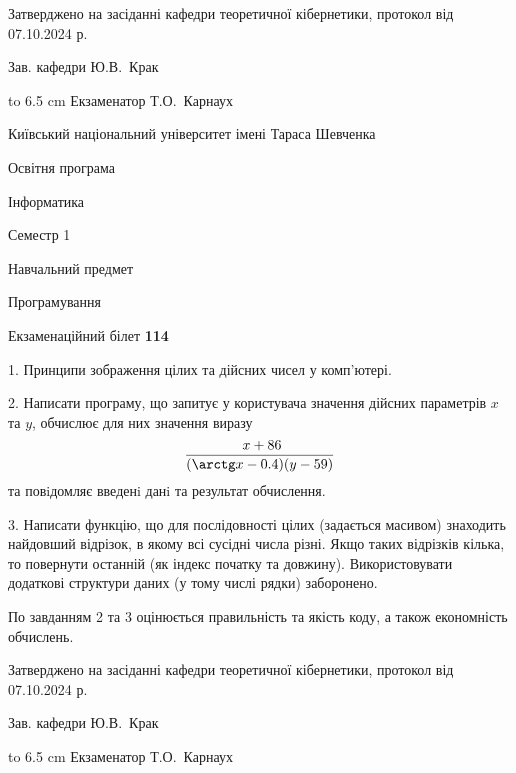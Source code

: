 \documentclass[12pt, ukrainian]{article}
\begin{document}
{\smallskip\smallskip \begin {scriptsize} Затверджено на засіданні кафедри теоретичної кібернетики, протокол   від   07.10.2024 р.\par\smallskip\smallskip\smallskip\smallskip
{\parbox {6.5 cm} {Зав. кафедри \dotfill Ю.В.~Крак}}\hspace {0.7cm} {\hbox to 6.5 cm { Екзаменатор \dotfill Т.О.~Карнаух}} \end{scriptsize}}
\vspace{0.9cm}
{{\begin {scriptsize}\par
{ \center  Київський національний університет імені Тараса Шевченка \par}
{\parbox {5 cm}{Освітня програма \hfill}{\parbox {7 cm}{Інформатика\hfill}}\parbox {6 cm}{\hfill Семестр 1}}\par
{\parbox {5 cm} {Навчальний предмет \hfill}\parbox {7 cm}{Програмування \hfill}\parbox {6cm}{\hfill}\par}\vspace{-15pt} \end{scriptsize}}{\center Екзаменаційний білет \No \textbf { 114 }\par}}
{%
1. Принципи зображення цілих та дійсних чисел у комп'ютері.%
\par
2. Написати програму, що запитує у користувача значення дійсних параметрів $x$ та $y$, обчислює для них значення виразу 
$$\frac{\ x + 86}{(\arctg x - 0.4) (y - 59)}$$ 
та повiдомляє введенi данi та результат обчислення.

\par
3. Написати функцію, що для послідовності цілих (задається масивом) знаходить найдовший відрізок, в якому всі сусідні числа різні. Якщо таких відрізків кілька, то повернути останній (як індекс початку та довжину). Використовувати додаткові структури даних (у тому числі рядки) заборонено.

По завданням 2 та 3 оцінюється правильність та якість коду, а також економність обчислень.

}
{\smallskip\smallskip \begin {scriptsize} Затверджено на засіданні кафедри теоретичної кібернетики, протокол   від   07.10.2024 р.\par\smallskip\smallskip\smallskip\smallskip
{\parbox {6.5 cm} {Зав. кафедри \dotfill Ю.В.~Крак}}\hspace {0.7cm} {\hbox to 6.5 cm { Екзаменатор \dotfill Т.О.~Карнаух}} \end{scriptsize}}
\end{document}
